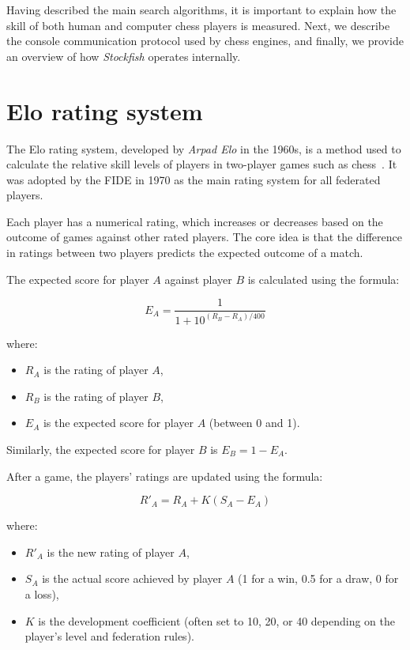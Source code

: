 \newpage

\noindent Having described the main search algorithms, it is important to explain how the skill of both human and computer chess players is measured. Next, we describe the console communication protocol used by chess engines, and finally, we provide an overview of how \textit{Stockfish} operates internally.

\section{Elo rating system}

The Elo rating system, developed by \textit{Arpad Elo} in the 1960s, is a method used to calculate the relative skill levels of players in two-player games such as chess~\cite{Elo}. It was adopted by the FIDE in 1970 as the main rating system for all federated players.

\vspace{1em}

\noindent Each player has a numerical rating, which increases or decreases based on the outcome of games against other rated players. The core idea is that the difference in ratings between two players predicts the expected outcome of a match.

\vspace{1em}

\noindent The expected score for player \( A \) against player \( B \) is calculated using the formula:

\[
E_A = \frac{1}{1 + 10^{(R_B - R_A)/400}}
\]

where:
\begin{itemize}
  \item \( R_A \) is the rating of player \( A \),
  \item \( R_B \) is the rating of player \( B \),
  \item \( E_A \) is the expected score for player \( A \) (between 0 and 1).
\end{itemize}

\noindent Similarly, the expected score for player \( B \) is \( E_B = 1 - E_A \).

\vspace{1em}

\noindent After a game, the players' ratings are updated using the formula:

\[
R'_A = R_A + K (S_A - E_A)
\]

where:
\begin{itemize}
  \item \( R'_A \) is the new rating of player \( A \),
  \item \( S_A \) is the actual score achieved by player \( A \) (1 for a win, 0.5 for a draw, 0 for a loss),
  \item \( K \) is the development coefficient (often set to 10, 20, or 40 depending on the player's level and federation rules).
\end{itemize}

